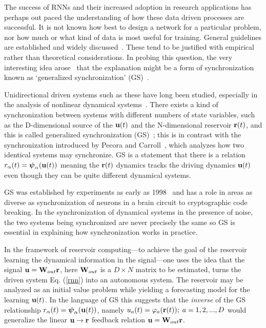 \documentclass[12pt]{article}
\begin{document}
The success of RNNs and their increased adoption in research applications has perhaps out paced the understanding of how these data driven processes are successful. It is not known how best to design a network for a particular problem, nor how much or what kind of data is most useful for training. General guidelines are established and widely discussed~\cite{vers07,Schrauwen07,luko11,Jaeger12}. These tend to be justified with empirical rather than theoretical considerations. In probing this question, the very interesting idea arose~\cite{hunt19,lymburn19} that the explanation might be a form of synchronization known as `generalized synchronization' (GS)~\cite{ sushchik95,ars96,kocarev96}.

Unidirectional driven systems such as these have long been studied, especially in the analysis of nonlinear dynamical systems~\cite{abar96,kantz04}. There exists a kind of synchronization between systems with different numbers of state variables, such as the D-dimensional source of the $\mbox{$\bf{u}$}(t)$ and the N-dimensional reservoir $\mbox{{\bf r}}(t)$, and this is called generalized synchronization (GS)~\cite{sushchik95,ars96}; this is in contrast with the synchronization introduced by Pecora and Carroll~\cite{pc90}, which analyzes how two identical systems may synchronize.  GS is a statement that there is a relation $r_{\alpha}(t) = \mbox{$\boldsymbol{\psi}$}_{\alpha}(\mbox{$\bf{u}$}(t))$ meaning the $\mbox{{\bf r}}(t)$ dynamics tracks the driving dynamics $\mbox{$\bf{u}$}(t)$ even though they can be quite different dynamical systems.

GS was established by experiments as early as 1998~\cite{tang98} and has a role in areas as diverse as synchronization of neurons in a brain circuit to cryptographic code breaking\cite{Alvarez06}. In the synchronization of dynamical systems in the presence of noise, the two systems being synchronized are never precisely the same so GS is essential in explaining how synchronization works in practice.

In the framework of reservoir computing---to achieve the goal of the reservoir learning the dynamical information in the signal---one uses the idea that the signal $\mbox{$\bf{u}$} = \mbox{$\bf{W}$}_{out} \mbox{{\bf r}}$, here $\mbox{$\bf{W}$}_{out}$ is a $D \times N$ matrix to be estimated, turns the driven system Eq. (\ref{rnn}) into an autonomous system. The reservoir may be analyzed as an initial value problem while yielding a forecasting model for the learning $\mbox{$\bf{u}$}(t)$. In the language of GS this suggests that the {\em inverse} of the GS relationship
$r_{\alpha}(t) = \mbox{$\boldsymbol{\psi}$}_{\alpha}(\mbox{$\bf{u}$}(t))$, namely $u_a(t) = \varphi_a(\mbox{{\bf r}}(t));\;a=1,2,...,D$ would generalize the linear $\mbox{$\bf{u}$} \to \mbox{{\bf r}}$ feedback relation $\mbox{$\bf{u}$} = \mbox{$\bf{W}$}_{out} \mbox{{\bf r}}$.
\end{document}
